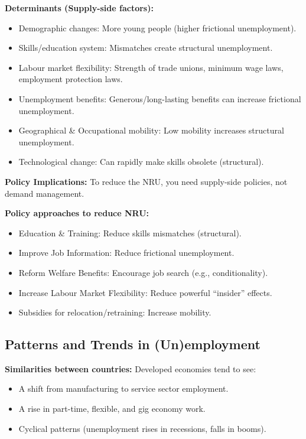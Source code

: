 \documentclass[11pt, a4paper, twoside]{book}
\begin{document}
\textbf{Determinants (Supply-side factors):}
\begin{itemize}
  \item Demographic changes: More young people (higher frictional unemployment).
  \item Skills/education system: Mismatches create structural unemployment.
  \item Labour market flexibility: Strength of trade unions, minimum wage laws, employment protection laws.
  \item Unemployment benefits: Generous/long-lasting benefits can increase frictional unemployment.
  \item Geographical \& Occupational mobility: Low mobility increases structural unemployment.
  \item Technological change: Can rapidly make skills obsolete (structural).
\end{itemize}

\begin{coreidea}
\textbf{Policy Implications:} To reduce the NRU, you need supply-side policies, not demand management.
\end{coreidea}

\textbf{Policy approaches to reduce NRU:}
\begin{itemize}
  \item Education \& Training: Reduce skills mismatches (structural).
  \item Improve Job Information: Reduce frictional unemployment.
  \item Reform Welfare Benefits: Encourage job search (e.g., conditionality).
  \item Increase Labour Market Flexibility: Reduce powerful ``insider'' effects.
  \item Subsidies for relocation/retraining: Increase mobility.
\end{itemize}

\subsection{Patterns and Trends in (Un)employment}

\textbf{Similarities between countries:} Developed economies tend to see:
\begin{itemize}
  \item A shift from manufacturing to service sector employment.
  \item A rise in part-time, flexible, and gig economy work.
  \item Cyclical patterns (unemployment rises in recessions, falls in booms).
\end{itemize}
\end{document}
